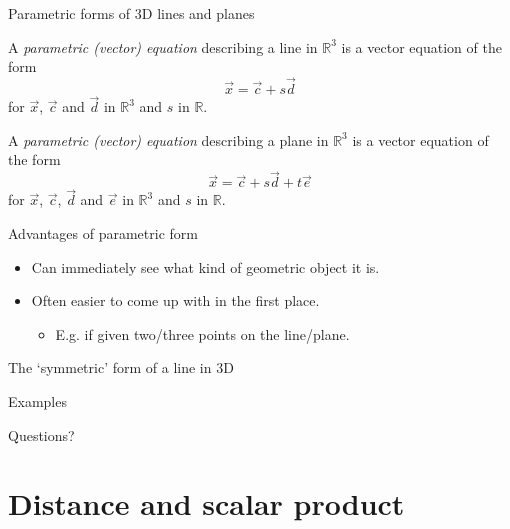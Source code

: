 \documentclass{beamer}
\begin{document}
\begin{frame}{Parametric forms of 3D lines and planes}
  \begin{definition}
    A \emph{parametric (vector) equation} describing a line in $\mathbb R^3$ is a vector equation of the form
    \begin{equation*}
      \vec{x} = \vec{c}+s\vec{d}
    \end{equation*}
    for $\vec{x}$, $\vec{c}$ and $\vec{d}$ in $\mathbb R^3$ and $s$ in $\mathbb R$.
  \end{definition}\vfill
  \begin{definition}
    A \emph{parametric (vector) equation} describing a plane in $\mathbb R^3$ is a vector equation of the form
    \begin{equation*}
      \vec{x} = \vec{c}+s\vec{d}+t\vec{e}
    \end{equation*}
    for $\vec{x}$, $\vec{c}$, $\vec{d}$ and $\vec{e}$ in $\mathbb R^3$ and $s$ in $\mathbb R$.
  \end{definition}
\end{frame}

\begin{frame}{Advantages of parametric form}
  \begin{itemize}
  \item Can immediately see what kind of geometric object it is.
  \item Often easier to come up with in the first place.
    \begin{itemize}
    \item E.g. if given two/three points on the line/plane.
    \end{itemize}
  \end{itemize}
\end{frame}

\begin{frame}{The `symmetric' form of a line in 3D}
  
\end{frame}

\begin{frame}{Examples}
  
\end{frame}

\begin{frame}
  Questions?
\end{frame}

\section{Distance and scalar product}
\end{document}

